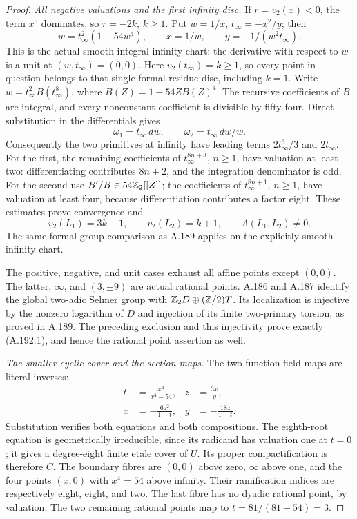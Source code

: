 \begin{proof}
\emph{All negative valuations and the first infinity disc.}
If \(r=v_2(x)<0\), the term \(x^5\) dominates,
so \(r=-2k\), \(k\geq1\).  Put
\(w=1/x\), \(t_\infty=-x^2/y\); then
\[
        w=t_\infty^2(1-54w^4),\qquad
        x=1/w,\qquad y=-1/(w^2t_\infty).
\tag{A.192.9}
\]
This is the actual smooth integral infinity chart:
the derivative with respect to \(w\) is a unit
at \((w,t_\infty)=(0,0)\).  Here
\(v_2(t_\infty)=k\geq1\), so every point in
question belongs to that single formal residue
disc, including \(k=1\).
Write \(w=t_\infty^2B(t_\infty^8)\), where
\(B(Z)=1-54ZB(Z)^4\).
The recursive coefficients of \(B\) are integral,
and every nonconstant coefficient is divisible
by fifty-four.  Direct substitution in the
differentials gives
\[
       \omega_1=t_\infty\,dw,\qquad
       \omega_2=t_\infty\,dw/w.
\tag{A.192.10}
\]
Consequently the two primitives at infinity have
leading terms \(2t_\infty^3/3\) and
\(2t_\infty\).
For the first, the remaining coefficients of
\(t_\infty^{8n+3}\), \(n\geq1\), have
valuation at least two: differentiating contributes
\(8n+2\), and the integration denominator is odd.
For the second use
\(B'/B\in54\mathbb Z_2[[Z]]\); the coefficients of
\(t_\infty^{8n+1}\), \(n\geq1\), have
valuation at least four, because differentiation
contributes a factor eight.  These estimates prove
convergence and
\[
                v_2(L_1)=3k+1,\qquad v_2(L_2)=k+1,
                \qquad\Lambda(L_1,L_2)\ne0.
\tag{A.192.11}
\]
The same formal-group comparison as A.189 applies
on the explicitly smooth infinity chart.

The positive, negative, and unit cases exhaust
all affine points except \((0,0)\).  The latter,
\(\infty\), and \((3,\pm9)\) are actual rational
points.  A.186 and A.187 identify the global
two-adic Selmer group with \(\mathbb Z_2D\oplus(\mathbb Z/2)T\).
Its localization is injective by the nonzero
logarithm of \(D\) and injection of its finite
two-primary torsion, as proved in A.189.
The preceding exclusion and this injectivity
prove exactly (A.192.1), and hence the rational
point assertion as well.

\emph{The smaller cyclic cover and the section maps.}
The two function-field maps are literal inverses:
\[
 \begin{aligned}
 t&=\frac{x^4}{x^4-54},& z&=\frac{3x}{y},\\
 x&=-\frac{6z^2}{1-t},& y&=-\frac{18z}{1-t}.
 \end{aligned}
\tag{A.192.12}
\]
Substitution verifies both equations and both
compositions.  The eighth-root equation is
geometrically irreducible, since its radicand
has valuation one at \(t=0\); it gives a
degree-eight finite etale cover of \(U\).
Its proper compactification is therefore \(C\).
The boundary fibres are \((0,0)\) above zero,
\(\infty\) above one, and the four points
\((x,0)\) with \(x^4=54\) above infinity.
Their ramification indices are respectively
eight, eight, and two.  The last fibre has no
dyadic rational point, by valuation.
The two remaining rational points map to
\(t=81/(81-54)=3\).


\end{proof}
